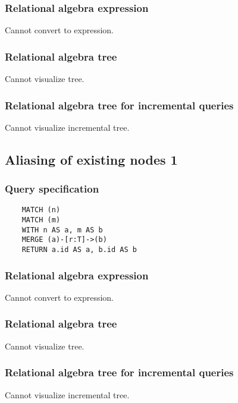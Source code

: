 	\subsubsection*{Relational algebra expression}

	Cannot convert to expression.

	\subsubsection*{Relational algebra tree}

	Cannot visualize tree.

	\subsubsection*{Relational algebra tree for incremental queries}

	Cannot visualize incremental tree.
	\subsection{Aliasing of existing nodes 1}

	\subsubsection*{Query specification}

	\begin{lstlisting}
	MATCH (n)
	MATCH (m)
	WITH n AS a, m AS b
	MERGE (a)-[r:T]->(b)
	RETURN a.id AS a, b.id AS b
	\end{lstlisting}


	\subsubsection*{Relational algebra expression}

	Cannot convert to expression.

	\subsubsection*{Relational algebra tree}

	Cannot visualize tree.

	\subsubsection*{Relational algebra tree for incremental queries}

	Cannot visualize incremental tree.
